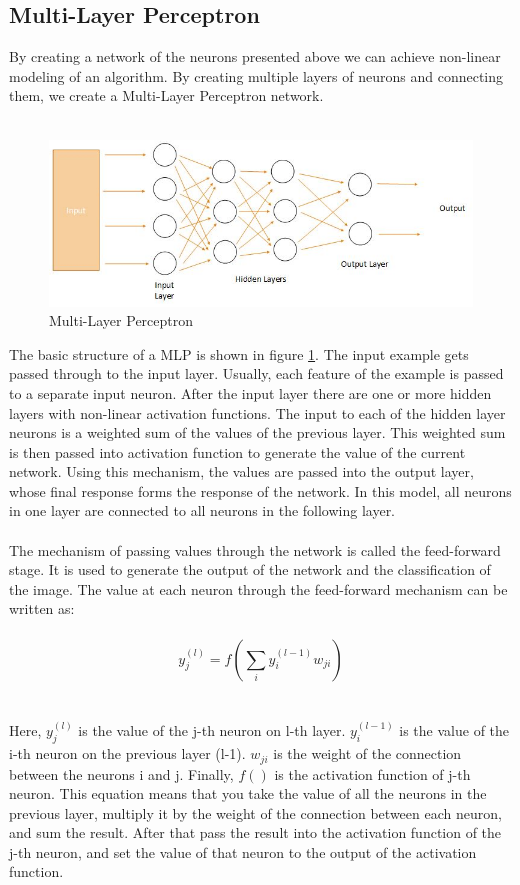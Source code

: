 \documentclass[12pt,twoside]{article} %
\begin{document}
\subsection{Multi-Layer Perceptron}
By creating a network of the neurons presented above we can achieve non-linear modeling of an algorithm. By creating multiple layers of neurons and connecting them, we create a Multi-Layer Perceptron network.
\\\\
\begin{figure}
	\hspace*{-.1cm}\includegraphics[scale=0.9]{mlp}
	\caption{Multi-Layer Perceptron}
	\label{fig:mlp}
\end{figure}
The basic structure of a MLP is shown in figure \ref{fig:mlp}. The input example gets passed through to the input layer. Usually, each feature of the example is passed to a separate input neuron. After the input layer there are one or more hidden layers with non-linear activation functions. The input to each of the hidden layer neurons is a weighted sum of the values of the previous layer. This weighted sum is then passed into activation function to generate the value of the current network. Using this mechanism, the values are passed into the output layer, whose final response forms the response of the network. In this model, all neurons in one layer are connected to all neurons in the following layer. 
\\\\
The mechanism of passing values through the network is called the feed-forward stage. It is used to generate the output of the network and the classification of the image. The value at each neuron through the feed-forward mechanism can be written as:
\\\\
$$y^{(l)}_j = f( \sum_{i} y^{(l-1)}_i w_{ji})$$
\\\\
Here, $y^{(l)}_j$ is the value of the j-th neuron on l-th layer. $y^{(l-1)}_i$ is the value of the i-th neuron on the previous layer (l-1). $w_{ji}$ is the weight of the connection between the neurons i and j. Finally, $f()$ is the activation function of j-th neuron. This equation means that you take the value of all the neurons in the previous layer, multiply it by the weight of the connection between each neuron, and sum the result. After that pass the result into the activation function of the j-th neuron, and set the value of that neuron to the output of the activation function.
\end{document}
